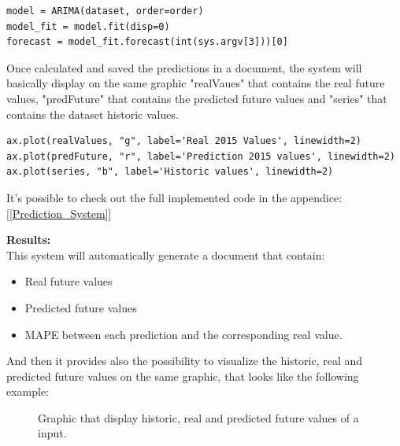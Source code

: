 \begin{lstlisting}
model = ARIMA(dataset, order=order)
model_fit = model.fit(disp=0)
forecast = model_fit.forecast(int(sys.argv[3]))[0]
\end{lstlisting}

Once calculated and saved the predictions in a document, the system will basically display on the same graphic "realVaues" that contains the real future values, "predFuture" that contains the predicted future values and "series" that contains the dataset historic values.
\begin{lstlisting}
ax.plot(realValues, "g", label='Real 2015 Values', linewidth=2)
ax.plot(predFuture, "r", label='Prediction 2015 values', linewidth=2)
ax.plot(series, "b", label='Historic values', linewidth=2)
\end{lstlisting}

It's possible to check out the full implemented code in the appendice: [\ref{Prediction_System}]

\newpage

\textbf{Results:}\\
This system will automatically generate a document that contain:
\vspace{-5mm}
\begin{itemize}
 \setlength{\itemsep}{-5pt} 
\item Real future values
\item Predicted future values
\item MAPE between each prediction and the corresponding real value.
\end{itemize}

And then it provides also the possibility to visualize the historic, real and predicted future values on the same graphic, that looks like the following example:

\begin{figure}[H]
    \caption{Graphic that display historic, real and predicted future values of a input.}
\end{figure}


\newpage



